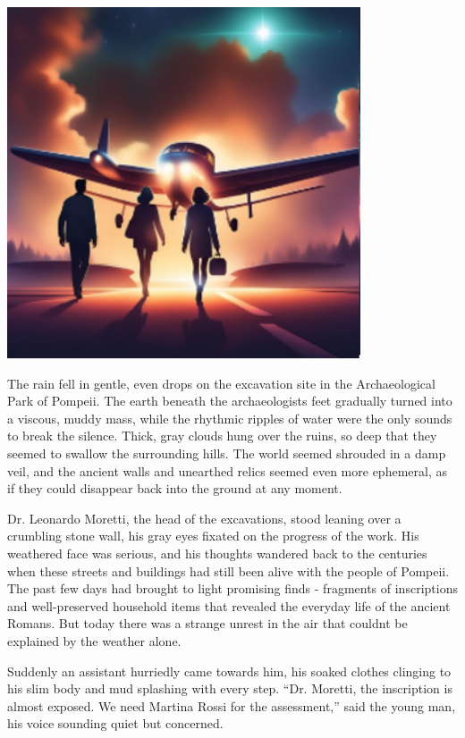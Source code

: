 \documentclass[
]{article}
\begin{document}
\includegraphics[width=4.11458in,height=4.09375in]{media/image7.png}

The rain fell in gentle, even drops on the excavation site in the
Archaeological Park of Pompeii. The earth beneath the
archaeologists\textquotesingle{} feet gradually turned into a viscous,
muddy mass, while the rhythmic ripples of water were the only sounds to
break the silence. Thick, gray clouds hung over the ruins, so deep that
they seemed to swallow the surrounding hills. The world seemed shrouded
in a damp veil, and the ancient walls and unearthed relics seemed even
more ephemeral, as if they could disappear back into the ground at any
moment.

Dr. Leonardo Moretti, the head of the excavations, stood leaning over a
crumbling stone wall, his gray eyes fixated on the progress of the work.
His weathered face was serious, and his thoughts wandered back to the
centuries when these streets and buildings had still been alive with the
people of Pompeii. The past few days had brought to light promising
finds - fragments of inscriptions and well-preserved household items
that revealed the everyday life of the ancient Romans. But today there
was a strange unrest in the air that couldn\textquotesingle t be
explained by the weather alone.

Suddenly an assistant hurriedly came towards him, his soaked clothes
clinging to his slim body and mud splashing with every step. ``Dr.
Moretti, the inscription is almost exposed. We need Martina Rossi for
the assessment,'' said the young man, his voice sounding quiet but
concerned.
\end{document}
